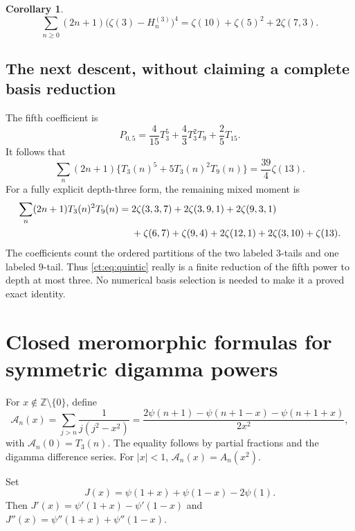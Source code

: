\documentclass[11pt]{article}
\numberwithin{equation}{section}
\newtheorem{corollary}[theorem]{Corollary}
\theoremstyle{definition}\newtheorem{definition}[theorem]{Definition}
\theoremstyle{remark}\newtheorem{remark}[theorem]{Remark}
\begin{document}
\begin{corollary}\label{ct:cor:quartic}
\begin{equation}\label{ct:eq:quartic}
 \sum_{n\ge0}(2n+1)\bigl(\zeta(3)-H_n^{(3)}\bigr)^4
       =\zeta(10)+\zeta(5)^2+2\zeta(7,3).
\end{equation}
\end{corollary}

\subsection{The next descent, without claiming a complete basis reduction}
The fifth coefficient is
\[
 P_{0,5}=\frac4{15}T_3^5+\frac43T_3^2T_9+\frac25T_{15}.
\]
It follows that
\begin{equation}\label{ct:eq:quintic}
 \sum_n(2n+1)\{T_3(n)^5+5T_3(n)^2T_9(n)\}
       =\frac{39}{4}\zeta(13).
\end{equation}
For a fully explicit depth-three form, the remaining mixed moment is
\begin{align}
 \sum_n(2n+1)T_3(n)^2T_9(n)
   ={}&2\zeta(3,3,7)+2\zeta(3,9,1)+2\zeta(9,3,1)\notag\\
     &+\zeta(6,7)+\zeta(9,4)
           +2\zeta(12,1)+2\zeta(3,10)+\zeta(13).
 \label{ct:eq:339}
\end{align}
The coefficients count the ordered partitions of the two labeled $3$-tails
and one labeled $9$-tail. Thus \eqref{ct:eq:quintic} really is a finite
reduction of the fifth power to depth at most three. No numerical basis
selection is needed to make it a proved exact identity.

\section{Closed meromorphic formulas for symmetric digamma powers}
\label{ct:sec:digamma}
For $x\notin\mathbb Z\setminus\{0\}$, define
\begin{equation}\label{ct:eq:A-x}
 \mathcal A_n(x)=\sum_{j>n}\frac1{j(j^2-x^2)}
 =\frac{2\psi(n+1)-\psi(n+1-x)-\psi(n+1+x)}{2x^2},
\end{equation}
with $\mathcal A_n(0)=T_3(n)$. The equality follows by partial fractions
and the digamma difference series. For $|x|<1$,
$\mathcal A_n(x)=A_n(x^2)$.

Set
\begin{equation}\label{ct:eq:J}
 J(x)=\psi(1+x)+\psi(1-x)-2\psi(1).
\end{equation}
Then $J'(x)=\psi'(1+x)-\psi'(1-x)$ and
$J''(x)=\psi''(1+x)+\psi''(1-x)$.
\end{document}
